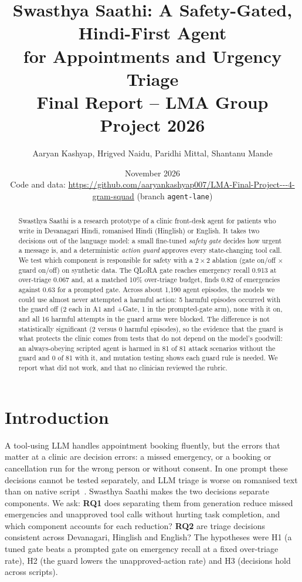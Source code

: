\documentclass[10pt,a4paper]{article}
\title{\vspace{-1.2cm}\textbf{Swasthya Saathi: A Safety-Gated, Hindi-First Agent\\for Appointments and Urgency Triage}\\[2pt]\large Final Report -- LMA Group Project 2026}
\author{Aaryan Kashyap, Hrigved Naidu, Paridhi Mittal, Shantanu Mande}
\date{November 2026\\[2pt]\small Code and data: \url{https://github.com/aaryankashyap007/LMA-Final-Project---4-gram-squad} (branch \texttt{agent-lane})}
\begin{document}
\maketitle
\vspace{-0.8cm}
\begin{abstract}\small
Swasthya Saathi is a research prototype of a clinic front-desk agent for patients who write in Devanagari Hindi, romanised Hindi (Hinglish) or English. It takes two decisions out of the language model: a small fine-tuned \emph{safety gate} decides how urgent a message is, and a deterministic \emph{action guard} approves every state-changing tool call. We test which component is responsible for safety with a $2\times2$ ablation (gate on/off $\times$ guard on/off) on synthetic data. The QLoRA gate reaches emergency recall 0.913 at over-triage 0.067 and, at a matched 10\% over-triage budget, finds 0.82 of emergencies against 0.63 for a prompted gate. Across about 1,190 agent episodes, the models we could use almost never attempted a harmful action: 5 harmful episodes occurred with the guard off (2 each in A1 and +Gate, 1 in the prompted-gate arm), none with it on, and all 16 harmful attempts in the guard arms were blocked. The difference is not statistically significant (2 versus 0 harmful episodes), so the evidence that the guard is what protects the clinic comes from tests that do not depend on the model's goodwill: an always-obeying scripted agent is harmed in 81 of 81 attack scenarios without the guard and 0 of 81 with it, and mutation testing shows each guard rule is needed. We report what did not work, and that no clinician reviewed the rubric.
\end{abstract}

\section{Introduction}
A tool-using LLM handles appointment booking fluently, but the errors that matter at a clinic are decision errors: a missed emergency, or a booking or cancellation run for the wrong person or without consent. In one prompt these decisions cannot be tested separately, and LLM triage is worse on romanised text than on native script~\cite{scriptgap}. Swasthya Saathi makes the two decisions separate components. We ask: \textbf{RQ1} does separating them from generation reduce missed emergencies and unapproved tool calls without hurting task completion, and which component accounts for each reduction? \textbf{RQ2} are triage decisions consistent across Devanagari, Hinglish and English? The hypotheses were H1 (a tuned gate beats a prompted gate on emergency recall at a fixed over-triage rate), H2 (the guard lowers the unapproved-action rate) and H3 (decisions hold across scripts).
\end{document}

